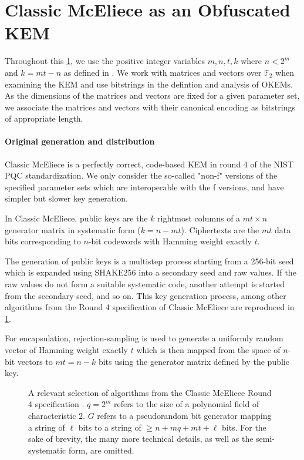 \section{Classic McEliece as an Obfuscated KEM} \label{sec:obfuscating-classic-mceliece}

Throughout this \cref{sec:obfuscating-classic-mceliece}, we use the positive integer variables $m,n,t,k$ where $n < 2^m$ and $k=mt-n$ as defined in \cite{NISTPQC-R4:ClassicMcEliece22}. We work with matrices and vectors over $\mathbb F_2$ when examining the KEM and use bitstrings in the defintion and analysis of OKEMs. As the dimensions of the matrices and vectors are fixed for a given parameter set, we associate the matrices and vectors with their canonical encoding as bitstrings of appropriate length.

\paragraph{Original generation and distribution}
Classic McEliece \cite{NISTPQC-R4:ClassicMcEliece22} is a perfectly correct, code-based KEM in round 4 of the NIST PQC standardization. We only consider the so-called "non-f" versions of the specified parameter sets which are interoperable with the f versions, and have simpler but slower key generation.

In Classic McEliece, public keys are the $k$ rightmost columns of a $mt \times n$ generator matrix in systematic form ($k = n - mt$). Ciphertexts are the $mt$ data bits corresponding to $n$-bit codewords with Hamming weight exactly $t$.

The generation of public keys is a multistep process starting from a 256-bit seed which is expanded using SHAKE256 into a secondary seed and raw values. If the raw values do not form a suitable systematic code, another attempt is started from the secondary seed, and so on. This key generation process, among other algorithms from the Round 4 specification of Classic McEliece are reproduced in \cref{fig:classic-mceliece-spec}.

For encapsulation, rejection-sampling is used to generate a uniformly random vector of Hamming weight exactly $t$ which is then mapped from the space of $n$-bit vectors to $mt=n-k$ bits using the generator matrix defined by the public key.

\begin{figure}
    
    \caption[
        A selection of algorithms from the Classic McEliece Round 4 specification.
    ]{
        A relevant selection of algorithms from the Classic McEliece Round 4 specification \cite{NISTPQC-R4:ClassicMcEliece22}. $q=2^m$ refers to the size of a polynomial field of characteristic $2$. $G$ refers to a pseudorandom bit generator mapping a string of $\ell$ bits to a string of $\geq n + mq + mt + \ell$ bits. For the sake of brevity, the many more technical details, as well as the semi-systematic form, are omitted.}
    \label{fig:classic-mceliece-spec}
\end{figure}

